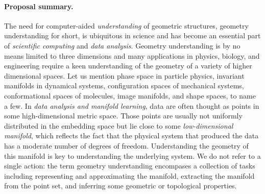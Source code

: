 


\paragraph{Proposal summary.} 

The need for computer-aided {\em understanding} of geometric structures, geometry understanding for short, is ubiquitous in science and has become an essential part of {\em scientific computing} and {\em data analysis}. Geometry understanding is by no means limited to three dimensions and many applications in physics, biology, and engineering require a keen understanding of the geometry of a variety of higher dimensional spaces. Let us mention phase space in particle physics, invariant manifolds in dynamical systems, configuration spaces of mechanical systems, conformational spaces of molecules, image manifolds, and shape spaces, to name a few. In {\em data analysis and manifold learning}, data are often thought as points in some high-dimensional metric space. Those points are usually not uniformly distributed in the embedding space but lie close to some {\em low-dimensional manifold}, which reflects the fact that the physical system that produced the data has a moderate number of degrees of freedom.  Understanding the geometry of this manifold is key to understanding the underlying system. We do not refer to a single action: the term geometry understanding encompases a collection of tasks including representing and approximating the manifold, extracting the manifold from the point set, and inferring some geometric or topological properties.

